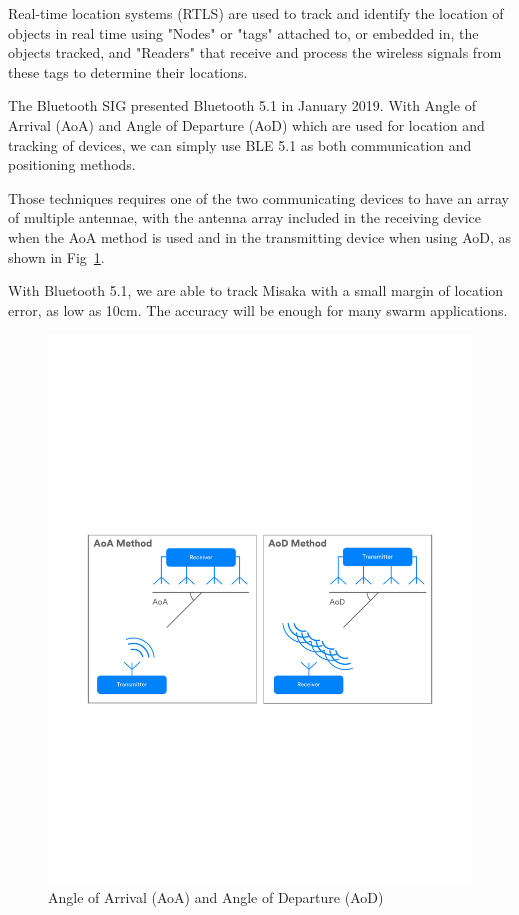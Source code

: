 \documentclass[sigconf]{acmart}
\begin{document}
Real-time location systems (RTLS) are used to track and identify the location of objects in real time using "Nodes" or "tags" attached to, or embedded in, the objects tracked, and "Readers" that receive and process the wireless signals from these tags to determine their locations.\cite{costs2009real}

The Bluetooth SIG presented Bluetooth 5.1 in January 2019. With Angle of Arrival (AoA) and Angle of Departure (AoD) which are used for location and tracking of devices, we can simply use BLE 5.1 as both communication and positioning methods.

Those techniques requires one of the two communicating devices to have an array of multiple antennae, with the antenna array included in the receiving device when the AoA method is used and in the transmitting device when using AoD, as shown in Fig~\ref{fig:AODAOE}.\cite{woolley2019bluetooth}

With Bluetooth 5.1, we are able to track Misaka with a small margin of location error, as low as 10cm. The accuracy will be enough for many swarm applications.

\begin{figure}[h]
  \centering
  \includegraphics[width=\linewidth]{AODAOE.pdf}
  \caption{Angle of Arrival (AoA) and Angle of Departure (AoD)}
  \label{fig:AODAOE}
\end{figure}
\end{document}
